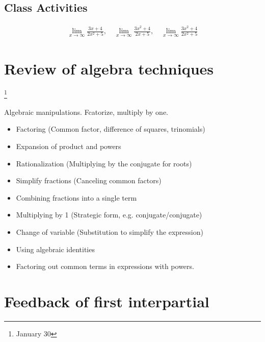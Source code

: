 \documentclass[../main-notes.tex]{subfile}
\begin{document}
\subsection{Class Activities}

\begin{gather*}
    \lim_{x\to\infty}\frac{3x+4}{2x^2+5}, \quad
    \lim_{x\to\infty}\frac{3x^2+4}{2x+5}, \quad
    \lim_{x\to\infty}\frac{3x^2+4}{2x^2+5} 
\end{gather*}

\newpage

\section{Review of algebra techniques}


\footnote{January 30}

Algebraic manipulations.
Fcatorize, multiply by one.

\begin{itemize}
    \item Factoring (Common factor, difference of squares, trinomials)
    \item Expansion of product and powers
    \item Rationalization (Multiplying by the conjugate for roots)
    \item Simplify fractions (Canceling common factors)
    \item Combining fractions into a single term
    \item Multiplying by 1 (Strategic form, e.g. conjugate/conjugate)
    \item Change of variable (Substitution to simplify the expression)
    \item Using algebraic identities 
    \item Factoring out common terms in expressions with powers.
\end{itemize}


\newpage

\section{Feedback of first interpartial}

\end{document}
